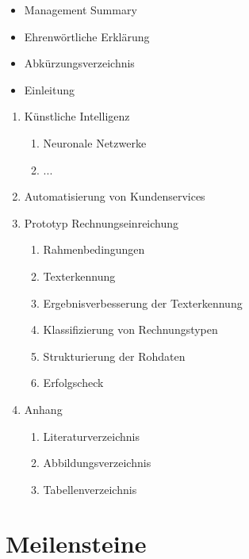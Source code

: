 \documentclass[12pt, twoside, table]{extarticle}
\begin{document}
{
    \renewcommand{\labelenumii}{\labelenumi\arabic{enumii}}
    \begin{itemize}
        \item Management Summary
        \item Ehrenwörtliche Erklärung
        \item Abkürzungsverzeichnis
        \item Einleitung
    \end{itemize}
    \begin{enumerate}
        \item Künstliche Intelligenz
        \begin{enumerate}
            \item Neuronale Netzwerke
            \item ...
        \end{enumerate}
        \item Automatisierung von Kundenservices
        \item Prototyp Rechnungseinreichung
        \begin{enumerate}
            \item Rahmenbedingungen
            \item Texterkennung
            \item Ergebnisverbesserung der Texterkennung
            \item Klassifizierung von Rechnungstypen
            \item Strukturierung der Rohdaten
            \item Erfolgscheck
        \end{enumerate}
        \item Anhang
        \begin{enumerate}
            \item Literaturverzeichnis
            \item Abbildungsverzeichnis
            \item Tabellenverzeichnis
        \end{enumerate}
    \end{enumerate}
}

\newpage
\section{Meilensteine}

 
\end{document}
